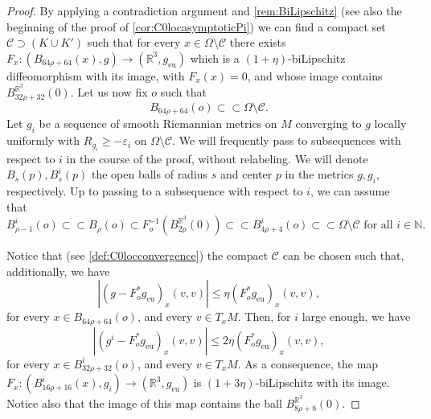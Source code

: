 \documentclass[a4paper,12pt,reqno]{amsart}
\numberwithin{equation}{section}
\theoremstyle{plain}
\theoremstyle{definition}
\theoremstyle{remark}
\newcommand{\eps}{\varepsilon}
\begin{document}
{\begin{proof}
By applying a contradiction argument and \cref{rem:BiLipschitz} (see also the beginning of the proof of \cref{cor:C0locasymptoticPi}) we can find a compact set $\mathcal{C}\supset  (K\cup K')$ such that for every $x\in \Omega\setminus \mathcal{C}$ there exists $F_x:(B_{64\rho+64}(x),g)\to (\mathbb R^3,g_{\mathrm{eu}})$ which is a $(1+\eta)$-biLipschitz diffeomorphism with its image, with $F_x(x)=0$, and whose image contains $B_{32\rho+32}^{\mathbb R^3}(0)$.
Let us now fix $o$ such that 
\[
B_{64\rho+64}(o)\subset\subset \Omega\setminus \mathcal{C}.
\]
Let $g_i$ be a sequence of smooth Riemannian metrics on $M$ converging to $g$ locally uniformly with $R_{g_i} \ge -\eps_i$ on $\Omega\setminus\mathcal{C}$. We will frequently pass to subsequences with respect to $i$ in the course of the proof, without relabeling. We will denote $B_s(p),B_s^i(p)$ the open balls of radius $s$ and center $p$ in the metrics $g,g_i$, respectively. Up to passing to a subsequence with respect to $i$, we can assume that 
\begin{equation}\label{eqn:Contenimento}
B^i_{\rho-1}(o)\subset\subset B_\rho(o)\subset F_o^{-1}(B_{2\rho}^{\mathbb R^3}(0)) \subset\subset B_{4\rho+4}^i(o)\subset\subset \Omega\setminus \mathcal{C}\,\,\text{for all $i\in\mathbb N$}.
\end{equation}

Notice that (see \cref{def:C0locconvergence}) the compact $\mathcal{C}$ can be chosen such that, additionally, we have 
\begin{equation}\label{eqn:BelleVicine}
|(g-F_o^*g_{\mathrm{eu}})_x(v,v)|\leq \eta(F_o^*g_{\mathrm{eu}})_x(v,v),
\end{equation}
for every $x\in B_{64\rho+64}(o)$, and every $v\in T_xM$. Then, for $i$ large enough, we have
\begin{equation}\label{eqn:ErControllo}
|(g^i-F_o^*g_{\mathrm{eu}})_x(v,v)|\leq 2\eta(F_o^*g_{\mathrm{eu}})_x(v,v),
\end{equation}
for every $x\in B_{32\rho+32}^i(o)$, and every $v\in T_xM$. As a consequence, the map $F_x:(B^i_{16\rho+16}(x),g_i)\to (\mathbb R^3,g_{\mathrm{eu}})$ is $(1+3\eta)$-biLipschitz with its image. Notice also that the image of this map contains the ball $B_{8\rho+8}^{\mathbb R^3}(0)$.
\smallskip


\end{proof}}
\end{document}
